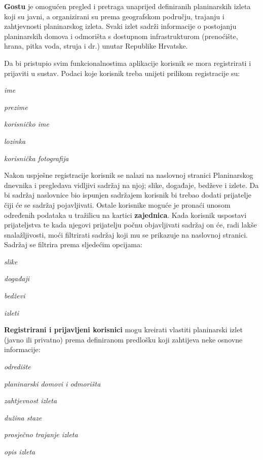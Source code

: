 \textbf{Gostu} je omogućen pregled i pretraga unaprijed definiranih planinarskih izleta koji su javni, a organizirani su prema geografskom području, trajanju i zahtjevnosti planinarskog izleta. Svaki izlet sadrži informacije o postojanju planinarskih domova i odmorišta s dostupnom infrastrukturom (prenoćište, hrana, pitka voda, struja i dr.) unutar Republike Hrvatske. \vspace{10pt}

Da bi pristupio svim funkcionalnostima aplikacije korisnik se mora registrirati i prijaviti u sustav. Podaci koje korisnik treba unijeti prilikom registracije su:

\begin{packed_item}
			\item \textit{ime}
			\item \textit{prezime}
			\item \textit{korisničko ime}
			\item \textit{lozinka}
			\item \textit{korisnička fotografija}
\end{packed_item}

Nakon uspješne registracije korisnik se nalazi na naslovnoj stranici Planinarskog dnevnika i pregledava vidljivi sadržaj na njoj; slike, događaje, bedževe i izlete. Da bi sadržaj naslovnice bio ispunjen sadržajem korisnik bi trebao dodati prijatelje čiji će se sadržaj pojavljivati. Ostale korisnike moguće je pronaći unosom određenih podataka u tražilicu na kartici \textbf{zajednica}. Kada korisnik uspostavi prijateljstva te kada njegovi prijatelju počnu objavljivati sadržaj on će, radi lakše snalažljivosti, moći filtrirati sadržaj koji mu se prikazuje na naslovnoj stranici. Sadržaj se filtrira prema sljedećim opcijama: 

\begin{packed_item}
			\item \textit {slike}
			\item \textit{događaji}
			\item \textit {bedževi}
			\item \textit{izleti}
\end{packed_item}

\textbf{Registrirani i prijavljeni korisnici} mogu kreirati vlastiti planinarski izlet (javno ili privatno) prema definiranom predlošku koji zahtijeva neke osnovne informacije:

\begin{packed_item}
			\item \textit {odredište}
			\item \textit{planinarski domovi i odmorišta}
			\item \textit{zahtjevnost izleta}
			\item \textit{dužina staze}
			\item \textit{prosječno trajanje izleta}
			\item \textit{opis izleta}
\end{packed_item} 

